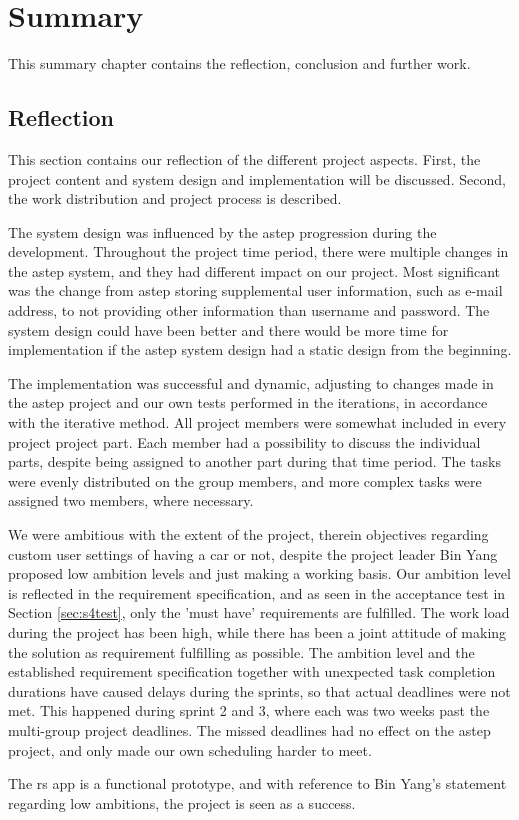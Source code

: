 \chapter{Summary}
This summary chapter contains the reflection, conclusion and further work.

\section{Reflection}
This section contains our reflection of the different project aspects.
First, the project content and system design and implementation will be discussed.
Second, the work distribution and project process is described.

The system design was influenced by the \gls{astep} progression during the development.
Throughout the project time period, there were multiple changes in the \gls{astep} system, and they had different impact on our project.
Most significant was the change from \gls{astep} storing supplemental user information, such as e-mail address, to not providing other information than username and password.
The system design could have been better and there would be more time for implementation if the \gls{astep} system design had a static design from the beginning.

The implementation was successful and dynamic, adjusting to changes made in the \gls{astep} project and our own tests performed in the iterations, in accordance with the iterative method.
All project members were somewhat included in every project project part.
Each member had a possibility to discuss the individual parts, despite being assigned to another part during that time period.
The tasks were evenly distributed on the group members, and more complex tasks were assigned two members, where necessary.

We were ambitious with the extent of the project, therein objectives regarding custom user settings of having a car or not, despite the project leader Bin Yang proposed low ambition levels and just making a working basis.
Our ambition level is reflected in the requirement specification, and as seen in the acceptance test in Section \ref{sec:s4test}, only the 'must have' requirements are fulfilled.
The work load during the project has been high, while there has been a joint attitude of making the solution as requirement fulfilling as possible.
The ambition level and the established requirement specification together with unexpected task completion durations have caused delays during the sprints, so that actual deadlines were not met.
This happened during sprint 2 and 3, where each was two weeks past the multi-group project deadlines.
The missed deadlines had no effect on the \gls{astep} project, and only made our own scheduling harder to meet.


The \gls{rs} app is a functional prototype, and with reference to Bin Yang's statement regarding low ambitions, the project is seen as a success.

